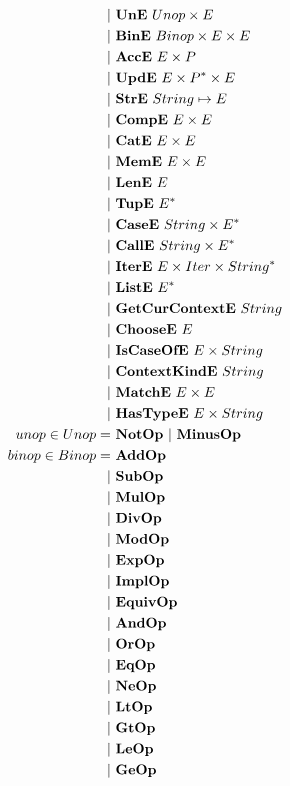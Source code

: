 \begin{align*}
    | & ~ \une ~ Unop \times E \\
    | & ~ \bine ~ Binop \times E \times E \\
    | & ~ \acce ~ E \times P \\
    | & ~ \upde ~ E \times \seq P \times E \\
    | & ~ \stre ~ String \mapsto E \\
    | & ~ \compe ~ E \times E \\
    | & ~ \cate ~ E \times E \\
    | & ~ \meme ~ E \times E \\
    | & ~ \lene ~ E \\
    | & ~ \tupe ~ \seq E \\
    | & ~ \casee ~ String \times \seq E \\
    | & ~ \calle ~ String \times \seq E \\
    | & ~ \itere ~ E \times Iter \times \seq{String} \\
    | & ~ \liste ~ \seq E \\
    | & ~ \getcurcontexte ~ String \\
    | & ~ \choosee ~ E \\
    | & ~ \iscaseofe ~ E \times String \\
    | & ~ \contextkinde ~ String \\
    | & ~ \matche ~ E \times E \\
    | & ~ \hastypee ~ E \times String \\
%
  unop \in Unop =& ~ \notop ~ | ~ \minusop \\
  binop \in Binop =& ~ \addop \\
    | & ~ \subop \\
    | & ~ \mulop \\
    | & ~ \divop \\
    | & ~ \modop \\
    | & ~ \expop \\
    | & ~ \implop \\
    | & ~ \equivop \\
    | & ~ \andop \\
    | & ~ \orop \\
    | & ~ \eqop \\
    | & ~ \neop \\
    | & ~ \ltop \\
    | & ~ \gtop \\
    | & ~ \leop \\
    | & ~ \geop \\
%

\end{align*}
